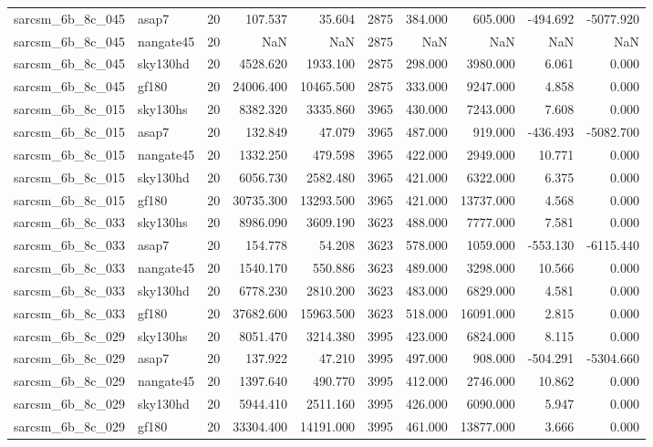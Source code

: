 \begin{longtable}{llrrrrrrrr}
sarcsm\_6b\_8c\_045 & asap7 & 20 & 107.537 & 35.604 & 2875 & 384.000 & 605.000 & -494.692 & -5077.920 \\
sarcsm\_6b\_8c\_045 & nangate45 & 20 & NaN & NaN & 2875 & NaN & NaN & NaN & NaN \\
sarcsm\_6b\_8c\_045 & sky130hd & 20 & 4528.620 & 1933.100 & 2875 & 298.000 & 3980.000 & 6.061 & 0.000 \\
sarcsm\_6b\_8c\_045 & gf180 & 20 & 24006.400 & 10465.500 & 2875 & 333.000 & 9247.000 & 4.858 & 0.000 \\
sarcsm\_6b\_8c\_015 & sky130hs & 20 & 8382.320 & 3335.860 & 3965 & 430.000 & 7243.000 & 7.608 & 0.000 \\
sarcsm\_6b\_8c\_015 & asap7 & 20 & 132.849 & 47.079 & 3965 & 487.000 & 919.000 & -436.493 & -5082.700 \\
sarcsm\_6b\_8c\_015 & nangate45 & 20 & 1332.250 & 479.598 & 3965 & 422.000 & 2949.000 & 10.771 & 0.000 \\
sarcsm\_6b\_8c\_015 & sky130hd & 20 & 6056.730 & 2582.480 & 3965 & 421.000 & 6322.000 & 6.375 & 0.000 \\
sarcsm\_6b\_8c\_015 & gf180 & 20 & 30735.300 & 13293.500 & 3965 & 421.000 & 13737.000 & 4.568 & 0.000 \\
sarcsm\_6b\_8c\_033 & sky130hs & 20 & 8986.090 & 3609.190 & 3623 & 488.000 & 7777.000 & 7.581 & 0.000 \\
sarcsm\_6b\_8c\_033 & asap7 & 20 & 154.778 & 54.208 & 3623 & 578.000 & 1059.000 & -553.130 & -6115.440 \\
sarcsm\_6b\_8c\_033 & nangate45 & 20 & 1540.170 & 550.886 & 3623 & 489.000 & 3298.000 & 10.566 & 0.000 \\
sarcsm\_6b\_8c\_033 & sky130hd & 20 & 6778.230 & 2810.200 & 3623 & 483.000 & 6829.000 & 4.581 & 0.000 \\
sarcsm\_6b\_8c\_033 & gf180 & 20 & 37682.600 & 15963.500 & 3623 & 518.000 & 16091.000 & 2.815 & 0.000 \\
sarcsm\_6b\_8c\_029 & sky130hs & 20 & 8051.470 & 3214.380 & 3995 & 423.000 & 6824.000 & 8.115 & 0.000 \\
sarcsm\_6b\_8c\_029 & asap7 & 20 & 137.922 & 47.210 & 3995 & 497.000 & 908.000 & -504.291 & -5304.660 \\
sarcsm\_6b\_8c\_029 & nangate45 & 20 & 1397.640 & 490.770 & 3995 & 412.000 & 2746.000 & 10.862 & 0.000 \\
sarcsm\_6b\_8c\_029 & sky130hd & 20 & 5944.410 & 2511.160 & 3995 & 426.000 & 6090.000 & 5.947 & 0.000 \\
sarcsm\_6b\_8c\_029 & gf180 & 20 & 33304.400 & 14191.000 & 3995 & 461.000 & 13877.000 & 3.666 & 0.000 \\

\end{longtable}
